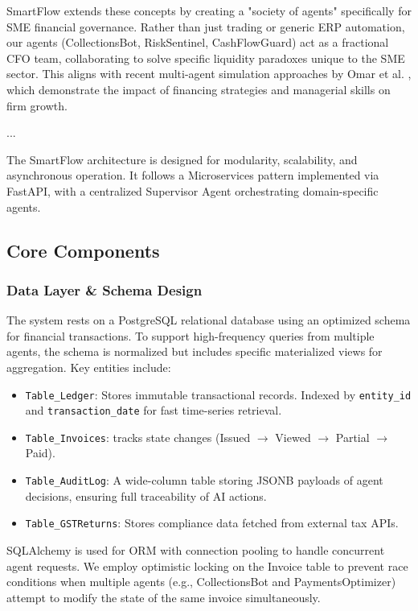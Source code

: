 \documentclass[conference]{IEEEtran}
\begin{document}
SmartFlow extends these concepts by creating a "society of agents" specifically for SME financial governance. Rather than just trading or generic ERP automation, our agents (CollectionsBot, RiskSentinel, CashFlowGuard) act as a fractional CFO team, collaborating to solve specific liquidity paradoxes unique to the SME sector. This aligns with recent multi-agent simulation approaches by Omar et al. \cite{omar2024}, which demonstrate the impact of financing strategies and managerial skills on firm growth.

...

The SmartFlow architecture is designed for modularity, scalability, and asynchronous operation. It follows a Microservices pattern implemented via FastAPI, with a centralized Supervisor Agent orchestrating domain-specific agents.

\subsection{Core Components}

\subsubsection{Data Layer \& Schema Design}
The system rests on a PostgreSQL relational database using an optimized schema for financial transactions. To support high-frequency queries from multiple agents, the schema is normalized but includes specific materialized views for aggregation. Key entities include:
\begin{itemize}
    \item \texttt{Table\_Ledger}: Stores immutable transactional records. Indexed by \texttt{entity\_id} and \texttt{transaction\_date} for fast time-series retrieval.
    \item \texttt{Table\_Invoices}: tracks state changes (Issued $\rightarrow$ Viewed $\rightarrow$ Partial $\rightarrow$ Paid).
    \item \texttt{Table\_AuditLog}: A wide-column table storing JSONB payloads of agent decisions, ensuring full traceability of AI actions.
    \item \texttt{Table\_GSTReturns}: Stores compliance data fetched from external tax APIs.
\end{itemize}

SQLAlchemy is used for ORM with connection pooling to handle concurrent agent requests. We employ optimistic locking on the Invoice table to prevent race conditions when multiple agents (e.g., CollectionsBot and PaymentsOptimizer) attempt to modify the state of the same invoice simultaneously.
\end{document}
